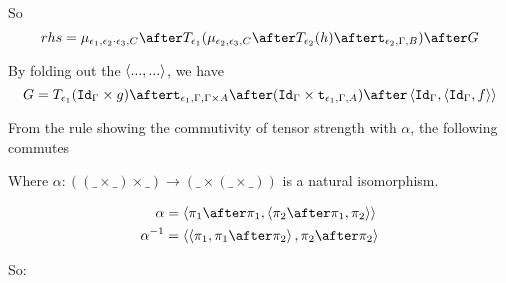 {    So
    \begin{equation}
        rhs = \bind{\e_1}{\e_2\dot\e_3}{C}\after\T{\e_1}{(\bind{\e_2}{\e_3}{C}\after \T{\e_2}{(h)} \after \tstrength{\e_2}{\G}{B})}\after G
    \end{equation}


    By folding out the $\left\langle..., ...\right\rangle$, we have
    \begin{equation}
        G = \T{\e_1}{(\idg\times g)}\after\tstrength{\e_1}{\G}{\G \times A}\after(\idg\times\tstrength{\e_1}{\G}{A})\after\pr{\idg}{\pr{\idg}{f}}
    \end{equation}

    From the rule  showing the commutivity of tensor strength with $\alpha$, the following commutes


    Where $\alpha: ((\_ \times \_) \times \_) \rightarrow (\_ \times (\_ \times \_))$ is a natural isomorphism.

    \begin{align}
        \alpha & = \pr{\p\after\p}{\pr{\pp\after\p}{\pp}}\\
        \alpha^{-1} &= \pr{\pr{\p}{\p\after\pp}}{\pp\after\pp}
    \end{align}

    So:

}
